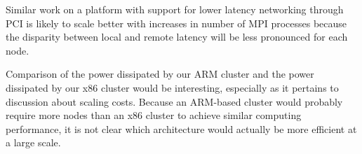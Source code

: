 \documentclass[11pt]{book}
\begin{document}
Similar work on a platform with support for lower latency networking through PCI
is likely to scale better with increases in number of MPI processes because the
disparity between local and remote latency will be less pronounced for each
node.

Comparison of the power dissipated by our ARM cluster and the power dissipated by our x86
cluster would be interesting, especially as it pertains to discussion about scaling costs.
Because an ARM-based cluster would probably require more nodes than an x86 cluster to
achieve similar computing performance, it is not clear which architecture would actually
be more efficient at a large scale.

\newpage
 

\end{document}
